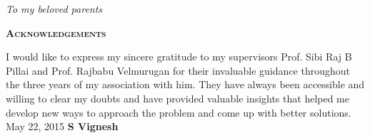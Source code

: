   \begin{center}  \null\vfill
   \textit{\Large To my beloved parents}
  \null\vfill
  \end{center}



\newpage
\thispagestyle{empty}
\begin{center}
  \begin{Huge}
    \textsc{\textbf{Acknowledgements}}
  \end{Huge}
\end{center}

\vspace{0.25in}

I would like to express my sincere gratitude to my supervisors Prof. Sibi Raj B Pillai and Prof. Rajbabu Velmurugan for their  invaluable guidance throughout the three years of my association with him. They have always been accessible and willing to clear my doubts and have provided valuable insights that helped me develop new ways to approach the problem and come up with better solutions.\\ %




\vspace{0.6in}
\noindent May 22, 2015    \hfill \textbf{S Vignesh}\\




